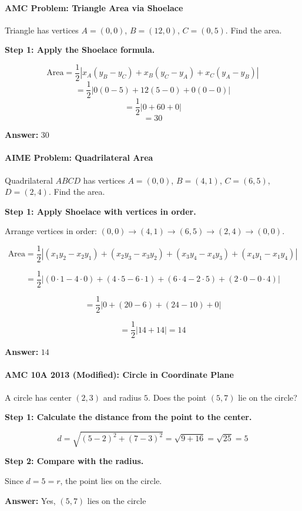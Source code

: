 ﻿\documentclass[12pt]{extarticle}
\begin{document}
\paragraph{AMC Problem: Triangle Area via Shoelace}

Triangle has vertices $A = (0, 0)$, $B = (12, 0)$, $C = (0, 5)$. Find the area.

\begin{solutionbox}
\textbf{Step 1: Apply the Shoelace formula.}

\[\text{Area} = \frac{1}{2}|x_A(y_B - y_C) + x_B(y_C - y_A) + x_C(y_A - y_B)|\]
\[= \frac{1}{2}|0(0 - 5) + 12(5 - 0) + 0(0 - 0)|\]
\[= \frac{1}{2}|0 + 60 + 0|\]
\[= 30\]

\textbf{Answer:} $\boxed{30}$
\end{solutionbox}

\paragraph{AIME Problem: Quadrilateral Area}

Quadrilateral $ABCD$ has vertices $A = (0, 0)$, $B = (4, 1)$, $C = (6, 5)$, $D = (2, 4)$. Find the area.

\begin{solutionbox}
\textbf{Step 1: Apply Shoelace with vertices in order.}

Arrange vertices in order: $(0, 0) \to (4, 1) \to (6, 5) \to (2, 4) \to (0, 0)$.

\[\text{Area} = \frac{1}{2}|(x_1 y_2 - x_2 y_1) + (x_2 y_3 - x_3 y_2) + (x_3 y_4 - x_4 y_3) + (x_4 y_1 - x_1 y_4)|\]

\[= \frac{1}{2}|(0 \cdot 1 - 4 \cdot 0) + (4 \cdot 5 - 6 \cdot 1) + (6 \cdot 4 - 2 \cdot 5) + (2 \cdot 0 - 0 \cdot 4)|\]

\[= \frac{1}{2}|0 + (20 - 6) + (24 - 10) + 0|\]

\[= \frac{1}{2}|14 + 14| = 14\]

\textbf{Answer:} $\boxed{14}$
\end{solutionbox}

\paragraph{AMC 10A 2013 (Modified): Circle in Coordinate Plane}

A circle has center $(2, 3)$ and radius $5$. Does the point $(5, 7)$ lie on the circle?

\begin{solutionbox}
\textbf{Step 1: Calculate the distance from the point to the center.}

\[d = \sqrt{(5-2)^2 + (7-3)^2} = \sqrt{9 + 16} = \sqrt{25} = 5\]

\textbf{Step 2: Compare with the radius.}

Since $d = 5 = r$, the point lies on the circle.

\textbf{Answer:} Yes, $\boxed{(5,7) \text{ lies on the circle}}$
\end{solutionbox}
\end{document}
